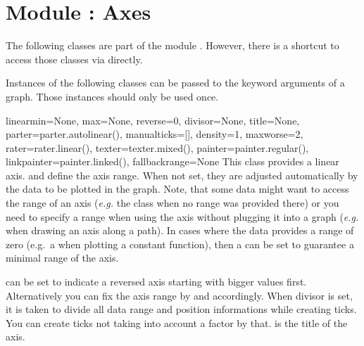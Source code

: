 \section{Module : Axes} %


The following classes are part of the module .
However, there is a shortcut to access those classes via
 directly.

Instances of the following classes can be passed to the 
keyword arguments of a graph. Those instances should only be used once.

\begin{classdesc}{linear}{min=None, max=None, reverse=0, divisor=None, title=None,
                          parter=parter.autolinear(), manualticks=[],
                          density=1, maxworse=2, rater=rater.linear(),
                          texter=texter.mixed(), painter=painter.regular(),
                          linkpainter=painter.linked(), fallbackrange=None}
  This class provides a linear axis.  and  define the
  axis range. When not set, they are adjusted automatically by the
  data to be plotted in the graph. Note, that some data might want to
  access the range of an axis (\emph{e.g.} the  class
  when no range was provided there) or you need to specify a range
  when using the axis without plugging it into a graph (\emph{e.g.}
  when drawing an axis along a path). In cases where the data provides
  a range of zero (e.g.~a when plotting a constant function), then a
   can be set to guarantee a minimal range of the
  axis.

   can be set to indicate a reversed axis starting with
  bigger values first. Alternatively you can fix the axis range by
   and  accordingly. When divisor is set, it is
  taken to divide all data range and position informations while
  creating ticks. You can create ticks not taking into account a
  factor by that.  is the title of the axis.


\end{classdesc}
